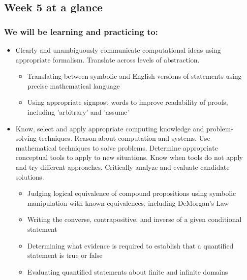 \documentclass[12pt, oneside]{article}
\begin{document}
\begin{flushright}
\end{flushright} 
\subsection*{Week 5 at a glance}

\subsubsection*{We will be learning and practicing to:}
\begin{itemize}

\item Clearly and unambiguously communicate computational ideas using appropriate formalism. Translate across levels of abstraction.
\begin{itemize}
   \item Translating between symbolic and English versions of statements using precise mathematical language
    \item Using appropriate signpost words to improve readability of proofs, including 'arbitrary' and 'assume'
\end{itemize}

\item Know, select and apply appropriate computing knowledge and problem-solving techniques. Reason about computation and systems. Use mathematical techniques to solve problems. Determine appropriate conceptual tools to apply to new situations. Know when tools do not apply and try different approaches. Critically analyze and evaluate candidate solutions.
\begin{itemize}
    \item Judging logical equivalence of compound propositions using symbolic manipulation with known equivalences, including DeMorgan's Law
    \item Writing the converse, contrapositive, and inverse of a given conditional statement
    \item Determining what evidence is required to establish that a quantified statement is true or false
    \item Evaluating quantified statements about finite and infinite domains
\end{itemize}


\end{itemize}
\end{document}
